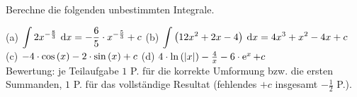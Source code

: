 \documentclass[11pt]{exam}
\begin{document}
\begin{questions}
\noaddpoints
\question[\totalpoints]
\addpoints
Berechne die folgenden unbestimmten Integrale.
{\begin{solution}
		(a) $\displaystyle\int2x^{-\frac{8}{3}}\:\operatorname{d}\!{x}=-\frac{6}{5}\cdot x^{-\frac{5}{3}}+c$ \qquad (b) $\displaystyle\int\left(12x^2+2x-4\right)\:\operatorname{d}\!{x}=4x^3+x^2-4x+c$\\
		(c) $-4\*\cos{x}-2\*\sin{x}+c$ \qquad (d) $4\*\ln{|x|}-\frac{4}{x}-6\*\exp{x}+c$\\
		Bewertung: je Teilaufgabe $1$ P. für die korrekte Umformung bzw. die ersten Summanden, $1$ P. für das vollständige Resultat (fehlendes $+c$ insgesamt $-\frac{1}{2}$ P.).
\end{solution}}
{}



\end{questions}
\end{document}
